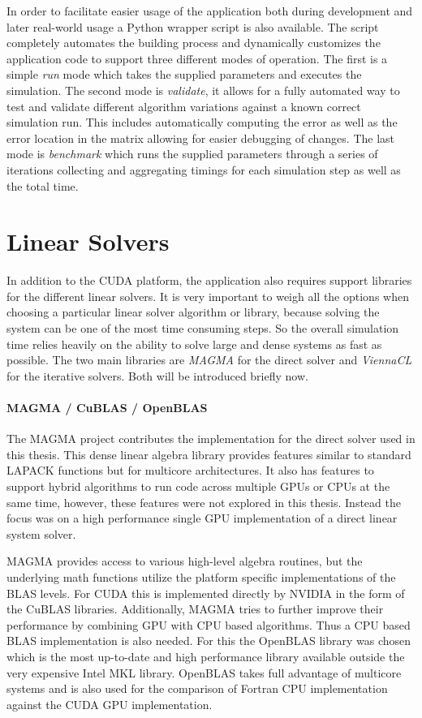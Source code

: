 \documentclass[a4paper,11pt]{kth-mag}
\begin{document}
In order to facilitate easier usage of the application both during development and later real-world usage a Python wrapper script is also available. The script completely automates the building process and dynamically customizes the application code to support three different modes of operation. The first is a simple \emph{run} mode which takes the supplied parameters and executes the simulation. The second mode is \emph{validate}, it allows for a fully automated way to test and validate different algorithm variations against a known correct simulation run. This includes automatically computing the error as well as the error location in the matrix allowing for easier debugging of changes. The last mode is \emph{benchmark} which runs the supplied parameters through a series of iterations collecting and aggregating timings for each simulation step as well as the total time.

\section{Linear Solvers}
In addition to the CUDA platform, the application also requires support libraries for the different linear solvers. It is very important to weigh all the options when choosing a particular linear solver algorithm or library, because solving the system can be one of the most time consuming steps. So the overall simulation time relies heavily on the ability to solve large and dense systems as fast as possible. The two main libraries are \emph{MAGMA} for the direct solver and \emph{ViennaCL} for the iterative solvers. Both will be introduced briefly now.

\paragraph{MAGMA / CuBLAS / OpenBLAS}
The MAGMA project contributes the implementation for the direct solver used in this thesis. This dense linear algebra library provides features similar to standard LAPACK functions but for multicore architectures. It also has features to support hybrid algorithms to run code across multiple GPUs or CPUs at the same time, however, these features were not explored in this thesis. Instead the focus was on a high performance single GPU implementation of a direct linear system solver.

MAGMA provides access to various high-level algebra routines, but the underlying math functions utilize the platform specific implementations of the BLAS levels. For CUDA this is implemented directly by NVIDIA in the form of the CuBLAS libraries. Additionally, MAGMA tries to further improve their performance by combining GPU with CPU based algorithms. Thus a CPU based BLAS implementation is also needed. For this the OpenBLAS library was chosen which is the most up-to-date and high performance library available outside the very expensive Intel MKL library. OpenBLAS takes full advantage of multicore systems and is also used for the comparison of Fortran CPU implementation against the CUDA GPU implementation.
\end{document}
